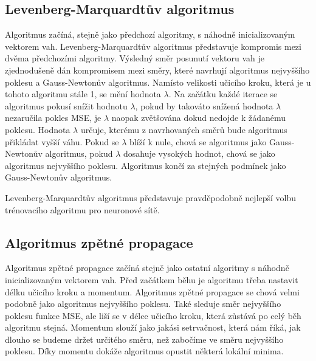 \documentclass[11pt,twoside,a4paper]{book}
\begin{document}
\subsection{Levenberg-Marquardtův algoritmus}
Algoritmus začíná, stejně jako předchozí algoritmy, s náhodně inicializovaným vektorem vah. Levenberg-Marquardtův algoritmus představuje kompromis mezi dvěma předchozími algoritmy. Výsledný směr posunutí vektoru vah je zjednodušeně dán kompromisem mezi směry, které navrhují algoritmus nejvyššího poklesu a Gauss-Newtonův algoritmus.  Namísto velikosti učicího kroku, která je u tohoto algoritmu stále 1, se mění hodnota \begin{math}\lambda\end{math}. Na začátku každé iterace se algoritmus pokusí snížit hodnotu \begin{math}\lambda\end{math}, pokud by takováto snížená hodnota \begin{math}\lambda\end{math} nezaručila pokles MSE, je \begin{math}\lambda\end{math} naopak zvětšována dokud nedojde k žádanému poklesu. Hodnota \begin{math}\lambda\end{math} určuje, kterému z navrhovaných směrů bude algoritmus přikládat vyšší váhu. Pokud se \begin{math}\lambda\end{math} blíží k nule, chová se algoritmus jako Gauss-Newtonův algoritmus, pokud \begin{math}\lambda\end{math} dosahuje vysokých hodnot, chová se jako algoritmus nejvyššího poklesu. Algoritmus končí za stejných podmínek jako Gauss-Newtonův algoritmus.\cite{nndocumentation}\cite{learningmachines} 

Levenberg-Marquardtův algoritmus představuje pravděpodobně nejlepší volbu trénovacího algoritmu pro neuronové sítě.

\subsection{Algoritmus zpětné propagace}
Algoritmus zpětné propagace začíná stejně jako ostatní algoritmy s náhodně inicializovaným vektorem vah. Před začátkem běhu je algoritmu třeba nastavit délku učicího kroku a momentum. Algoritmus zpětné propagace se chová velmi podobně jako algoritmus nejvyššího poklesu. Také sleduje směr nejvyššího poklesu funkce MSE, ale liší se v délce učicího kroku, která zůstává po celý běh algoritmu stejná. Momentum slouží jako jakási setrvačnost, která nám říká, jak dlouho se budeme držet určitého směru, než zabočíme ve směru nejvyššího poklesu. Díky momentu dokáže algoritmus opustit některá lokální minima. 
\end{document}
